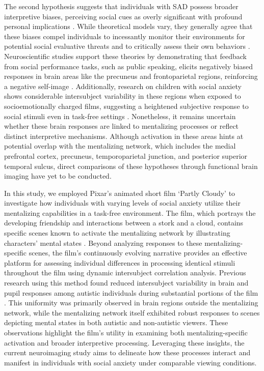 The second hypothesis suggests that individuals with SAD possess broader interpretive biases, perceiving social cues as overly significant with profound personal implications \citep{clark1995,rapee1997}. While theoretical models vary, they generally agree that these biases compel individuals to incessantly monitor their environments for potential social evaluative threats \citep{amir1998,constans1999,heimberg2014,hirsch2004information,stopa2000} and to critically assess their own behaviors \citep{rapee1992,stopa1993}. Neuroscientific studies support these theories by demonstrating that feedback from social performance tasks, such as public speaking, elicits negatively biased responses in brain areas like the precuneus and frontoparietal regions, reinforcing a negative self-image \citep{koban2023}. Additionally, research on children with social anxiety shows considerable intersubject variability in these regions when exposed to socioemotionally charged films, suggesting a heightened subjective response to social stimuli even in task-free settings \citep{camacho2023}. Nonetheless, it remains uncertain whether these brain responses are linked to mentalizing processes or reflect distinct interpretive mechanisms. Although activation in these areas hints at potential overlap with the mentalizing network, which includes the medial prefrontal cortex, precuneus, temporoparietal junction, and posterior superior temporal sulcus, direct comparisons of these hypotheses through functional brain imaging have yet to be conducted.

In this study, we employed Pixar's animated short film `Partly Cloudy' to investigate how individuals with varying levels of social anxiety utilize their mentalizing capabilities in a task-free environment. The film, which portrays the developing friendship and interactions between a stork and a cloud, contains specific scenes known to activate the mentalizing network by illustrating characters' mental states \citep{jacoby2016,paunov2019,richardson2018}. Beyond analyzing responses to these mentalizing-specific scenes, the film's continuously evolving narrative provides an effective platform for assessing individual differences in processing identical stimuli throughout the film using dynamic intersubject correlation analysis. Previous research using this method found reduced intersubject variability in brain and pupil responses among autistic individuals during substantial portions of the film \citep{mangnus2024bpcnni}. This uniformity was primarily observed in brain regions outside the mentalizing network, while the mentalizing network itself exhibited robust responses to scenes depicting mental states in both autistic and non-autistic viewers. These observations highlight the film's utility in examining both mentalizing-specific activation and broader interpretive processing. Leveraging these insights, the current neuroimaging study aims to delineate how these processes interact and manifest in individuals with social anxiety under comparable viewing conditions.

